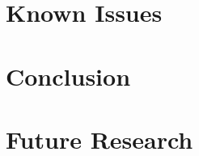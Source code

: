 \section{Known Issues}
\blindtext[3]

\section{Conclusion}
\blindtext[3]

\section{Future Research}
\blindtext[3]